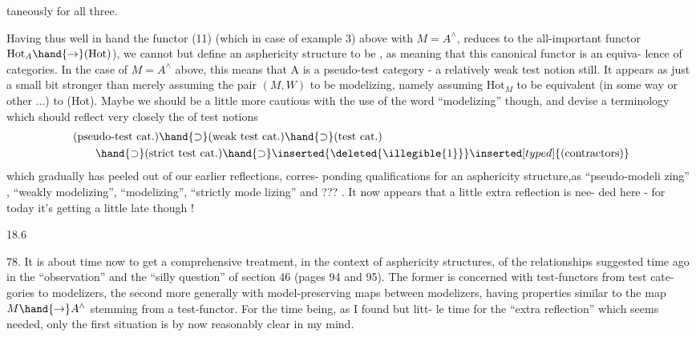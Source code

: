 taneously for all three.

Having thus well in hand the  functor (11) (which in
case of example  3) above with $M=A^{\wedge}$, reduces to the all-important
functor $\mathrm{Hot}_{A}\hand{\to}(\mathrm{Hot})$),  we cannot but define an asphericity structure
to be \hand{\uline{\textcolor{black}{modelizing}}} , as meaning that this canonical functor is an equiva-%
lence of categories. In the case of $M= A^{\wedge}$ above, this means that A
is a pseudo-test category - a relatively weak test notion still. It
appears as just a  small bit stronger than merely assuming the pair
$(M,W)$ to be modelizing,  namely assuming $\mathrm{Hot}_{M}$ to be equivalent (in some
way or other ...) to (Hot). Maybe we should be a little more cautious
with the use of the word ``modelizing'' though, and devise a terminology
which should reflect very closely the  of 
test notions
\[
\begin{aligned}&\text{(pseudo-test cat.)}\hand{\supset}\text{(weak test cat.)}\hand{\supset}\text{(test cat.)}\\&\qquad\hand{\supset}\text{(strict test cat.)}\hand{\supset} \inserted{\deleted{\illegible{1}}}\inserted[typed]{\text{(contractors)}}\end{aligned}
\]
which gradually has peeled out of our earlier reflections,   corres-%
ponding qualifications for an asphericity structure,as  ``pseudo-modeli%
zing'' ,  ``weakly modelizing'', ``modelizing'', ``strictly mode%
lizing''\hand{,} and ??? . It now appears that a little extra reflection is nee-%
ded here - for today it's getting a little late though !

18.6

78. It is about time now to get a comprehensive treatment, in the
context of asphericity structures, of the relationships suggested time
ago in the ``observation'' and the ``silly question'' of section 46 (pages
94 and 95). The former is concerned with test-functors from test cate-%
gories to modelizers, the second more generally with model-preserving
maps between modelizers, having properties similar to the map $M\hand{\to} A^{\wedge}$
stemming from a test-functor. For the time being, as I found but litt-%
le time for the ``extra reflection'' which seems needed, only the first
situation is by now reasonably clear in my mind.

